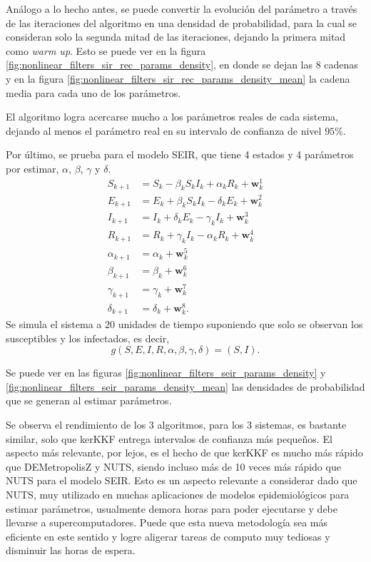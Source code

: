 Análogo a lo hecho antes, se puede convertir la evolución del parámetro a través de las iteraciones del algoritmo en una densidad de probabilidad, para la cual se consideran solo la segunda mitad de las iteraciones, dejando la primera mitad como \textit{warm up}. Esto se puede ver en la figura \ref{fig:nonlinear_filters_sir_rec_params_density}, en donde se dejan las $8$ cadenas y en la figura \ref{fig:nonlinear_filters_sir_rec_params_density_mean} la cadena media para cada uno de los parámetros.

El algoritmo logra acercarse mucho a los parámetros reales de cada sistema, dejando al menos el parámetro real en su intervalo de confianza de nivel $95$\%.

Por último, se prueba para el modelo SEIR, que tiene 4 estados y 4 parámetros por estimar, $\alpha$, $\beta$, $\gamma$ y $\delta$.
\begin{equation*}
    \begin{aligned}
        S_{k+1} &= S_k - \beta_k S_k I_k + \alpha_k R_k + \mathbf{w}_k^1 \\
        E_{k+1} &= E_k + \beta_k S_k I_k - \delta_k E_k + \mathbf{w}_k^2 \\
        I_{k+1} &= I_k + \delta_k E_k - \gamma_k I_k + \mathbf{w}_k^3 \\
        R_{k+1} &= R_k + \gamma_k I_k - \alpha_k R_k + \mathbf{w}_k^4 \\
        \alpha_{k+1} &= \alpha_k + \mathbf{w}_k^5 \\
        \beta_{k+1} &= \beta_k + \mathbf{w}_k^6 \\
        \gamma_{k+1} &= \gamma_k + \mathbf{w}_k^7 \\
        \delta_{k+1} &= \delta_k + \mathbf{w}_k^8.
    \end{aligned}
\end{equation*}
Se simula el sistema a $20$ unidades de tiempo suponiendo que solo se observan los susceptibles y los infectados, es decir,
\begin{equation*}
    g(S, E, I, R, \alpha, \beta, \gamma, \delta) = (S, I).
\end{equation*}

Se puede ver en las figuras \ref{fig:nonlinear_filters_seir_params_density} y \ref{fig:nonlinear_filters_seir_params_density_mean} las densidades de probabilidad que se generan al estimar parámetros. 

Se observa el rendimiento de los 3 algoritmos, para los 3 sistemas, es bastante similar, solo que kerKKF entrega intervalos de confianza más pequeños. El aspecto más relevante, por lejos, es el hecho de que kerKKF es mucho más rápido que DEMetropolisZ y NUTS, siendo incluso más de 10 veces más rápido que NUTS para el modelo SEIR. Esto es un aspecto relevante a considerar dado que NUTS, muy utilizado en muchas aplicaciones de modelos epidemiológicos para estimar parámetros, usualmente demora horas para poder ejecutarse y debe llevarse a supercomputadores. Puede que esta nueva metodología sea más eficiente en este sentido y logre aligerar tareas de computo muy tediosas y disminuir las horas de espera.

